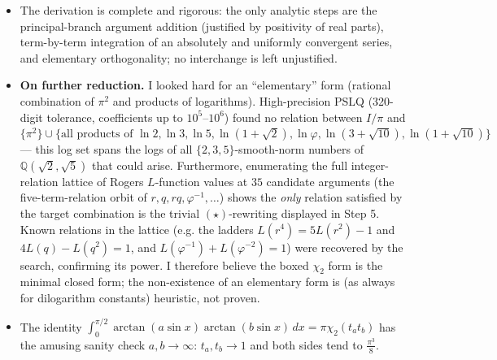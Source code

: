 \documentclass[11pt]{article}
\theoremstyle{remark}
\begin{document}
\begin{itemize}
\item The derivation is complete and rigorous: the only analytic steps are the principal-branch argument addition (justified by positivity of real parts), term-by-term integration of an absolutely and uniformly convergent series, and elementary orthogonality; no interchange is left unjustified.
\item \textbf{On further reduction.} I looked hard for an ``elementary'' form (rational combination of $\pi^2$ and products of logarithms). High-precision PSLQ (320-digit tolerance, coefficients up to $10^5$--$10^6$) found no relation between $I/\pi$ and $\{\pi^2\}\cup\{\text{all products of }\ln 2,\ln3,\ln5,\ln(1+\sqrt2),\ln\varphi,\ln(3+\sqrt{10}),\ln(1+\sqrt{10})\}$ --- this log set spans the logs of all $\{2,3,5\}$-smooth-norm numbers of $\mathbb Q(\sqrt2,\sqrt5)$ that could arise. Furthermore, enumerating the full integer-relation lattice of Rogers $L$-function values at $35$ candidate arguments (the five-term-relation orbit of $r,q,rq,\varphi^{-1},\dots$) shows the \emph{only} relation satisfied by the target combination is the trivial $(\star)$-rewriting displayed in Step 5. Known relations in the lattice (e.g. the ladders $L(r^4)=5L(r^2)-1$ and $4L(q)-L(q^2)=1$, and $L(\varphi^{-1})+L(\varphi^{-2})=1$) were recovered by the search, confirming its power. I therefore believe the boxed $\chi_2$ form is the minimal closed form; the non-existence of an elementary form is (as always for dilogarithm constants) heuristic, not proven.
\item The identity $\int_0^{\pi/2}\arctan(a\sin x)\arctan(b\sin x)\,dx=\pi\chi_2(t_at_b)$ has the amusing sanity check $a,b\to\infty$: $t_a,t_b\to1$ and both sides tend to $\frac{\pi^3}{8}$.
\end{itemize}
\end{document}
